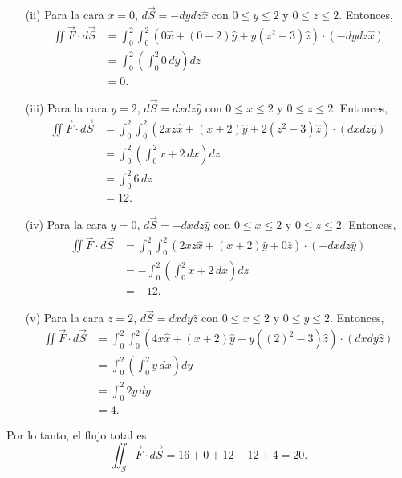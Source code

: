 \begin{ejemplo}
\begin{itemize}
        \item[(ii)] Para la cara $x = 0$, $d\Vec{S} = -dydz \hat{x}$ con $0 \leq y \leq 2$ y $0 \leq z \leq 2$. Entonces,
        \begin{align*}
             \iint \Vec{F} \cdot d\Vec{S} &= \int_0^2 \int_0^2 (0\hat{x} + (0+2) \hat{y} + y(z^2-3) \hat{z}) \cdot (-dydz \hat{x})  \\
             &= \int_0^2 \left( \int_0^2 0 \, dy\right) dz\\
             &= 0.
        \end{align*}

        \item[(iii)] Para la cara $y = 2$, $d\Vec{S} = dxdz \hat{y}$ con $0 \leq x \leq 2$ y $0 \leq z \leq 2$. Entonces,
        \begin{align*}
             \iint \Vec{F} \cdot d\Vec{S} &= \int_0^2 \int_0^2 (2xz \hat{x} + (x+2) \hat{y} + 2(z^2-3) \hat{z}) \cdot (dxdz \hat{y})  \\
             &= \int_0^2 \left( \int_0^2 x+2 \,dx\right) dz\\
             &=  \int_0^2   6 \, dz \\
             &= 12.
        \end{align*}

        \item[(iv)] Para la cara $y = 0$, $d\Vec{S} = -dxdz \hat{y}$ con $0 \leq x \leq 2$ y $0 \leq z \leq 2$. Entonces,
        \begin{align*}
             \iint \Vec{F} \cdot d\Vec{S} &= \int_0^2 \int_0^2 (2xz \hat{x} + (x+2) \hat{y} + 0 \hat{z}) \cdot (-dxdz \hat{y})  \\
             &=- \int_0^2 \left( \int_0^2 x+2 \, dx\right) dz\\
             &=  - 12.
        \end{align*}

        \item[(v)] Para la cara $z = 2$, $d\Vec{S} = dxdy \hat{z}$ con $0 \leq x \leq 2$ y $0 \leq y \leq 2$. Entonces,
        \begin{align*}
             \iint \Vec{F} \cdot d\Vec{S} &= \int_0^2 \int_0^2 (4x \hat{x} + (x+2) \hat{y} + y((2)^2-3) \hat{z}) \cdot (dxdy \hat{z})  \\
             &= \int_0^2 \left( \int_0^2 y\, dx\right) dy\\
             &= \int_0^2 2y\,dy \\
             &= 4.
        \end{align*}
    \end{itemize}

    Por lo tanto, el flujo total es
    $$\iint_S \Vec{F} \cdot d\Vec{S} = 16 + 0 + 12 - 12 + 4 = 20.$$
\end{ejemplo}

